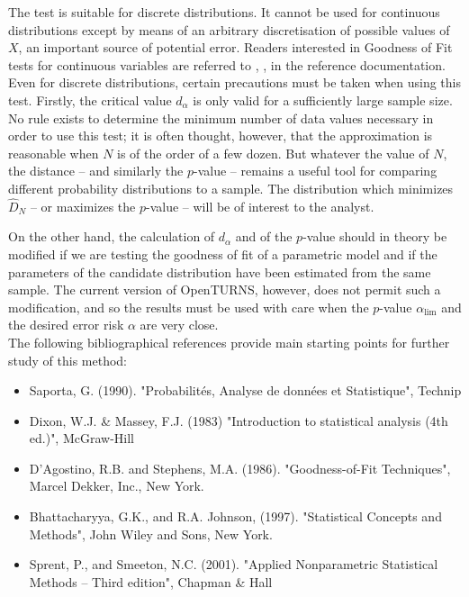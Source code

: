 {
  The test is suitable for discrete distributions. It cannot be used for continuous distributions except by means of an arbitrary discretisation of possible values of $X$, an important source of potential error. Readers interested in Goodness of Fit tests for continuous variables are referred to , ,  in the reference documentation.\\

  Even for discrete distributions, certain precautions must be taken when using this test. Firstly, the critical value $d_\alpha$ is only valid for a sufficiently large sample size. No rule exists to determine the minimum number of data values necessary in order to use this test; it is often thought, however, that the approximation is reasonable when $N$ is of the order of a few dozen. But whatever the value of $N$, the distance -- and similarly the $p$-value -- remains a useful tool for comparing different probability distributions to a sample. The distribution which minimizes $\widehat{D}_N$ -- or maximizes the $p$-value -- will be of interest to the analyst.

  On the other hand, the calculation of $d_\alpha$ and of the $p$-value should in theory be modified if we are testing the goodness of fit of a parametric model and if the parameters of the candidate distribution have been estimated from the same sample. The current version of OpenTURNS, however, does not permit such a modification, and so the results must be used with care when the $p$-value $\alpha_\textrm{lim}$ and the desired error risk $\alpha$ are very close.\\

  The following bibliographical references provide main starting points for further study of this method:
  \begin{itemize}
  \item Saporta, G. (1990). "Probabilités, Analyse de données et Statistique", Technip
  \item Dixon, W.J. \& Massey, F.J. (1983) "Introduction to statistical analysis (4th ed.)", McGraw-Hill
  \item D'Agostino, R.B. and Stephens, M.A. (1986). "Goodness-of-Fit Techniques", Marcel Dekker, Inc., New York.
  \item Bhattacharyya, G.K., and R.A. Johnson, (1997). "Statistical Concepts and Methods", John Wiley and Sons, New York.
  \item Sprent, P., and Smeeton, N.C. (2001). "Applied Nonparametric Statistical Methods -- Third edition", Chapman \& Hall
\end{itemize}}
